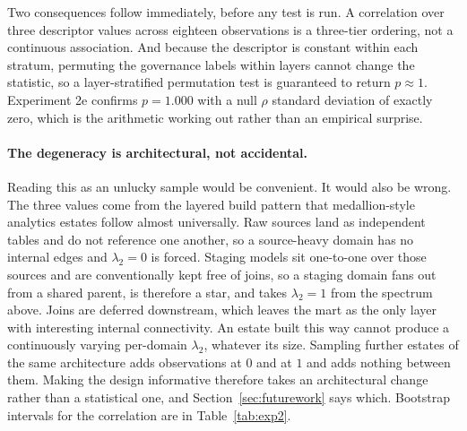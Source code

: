 \documentclass[11pt,a4paper]{article}
\begin{document}
Two consequences follow immediately, before any test is run. A
correlation over three descriptor values across eighteen observations is
a three-tier ordering, not a continuous association. And because the
descriptor is constant within each stratum, permuting the governance
labels within layers cannot change the statistic, so a layer-stratified
permutation test is guaranteed to return $p \approx 1$. Experiment 2e
confirms $p = 1.000$ with a null $\rho$ standard deviation of exactly
zero, which is the arithmetic working out rather than an empirical
surprise.

\paragraph{The degeneracy is architectural, not accidental.}
Reading this as an unlucky sample would be convenient. It would also be
wrong. The three values come from the layered build pattern that
medallion-style analytics estates follow almost universally. Raw sources
land as independent tables and do not reference one another, so a
source-heavy domain has no internal edges and $\lambda_2 = 0$ is forced.
Staging models sit one-to-one over those sources and are conventionally
kept free of joins, so a staging domain fans out from a shared parent,
is therefore a star, and takes $\lambda_2 = 1$ from the spectrum above.
Joins are deferred downstream, which leaves the mart as the only layer
with interesting internal connectivity. An estate built this way cannot
produce a continuously varying per-domain $\lambda_2$, whatever its
size. Sampling further estates of the same architecture adds
observations at $0$ and at $1$ and adds nothing between them. Making the
design informative therefore takes an architectural change rather than a
statistical one, and Section~\ref{sec:futurework} says which. Bootstrap
intervals for the correlation are in Table~\ref{tab:exp2}.
\end{document}
